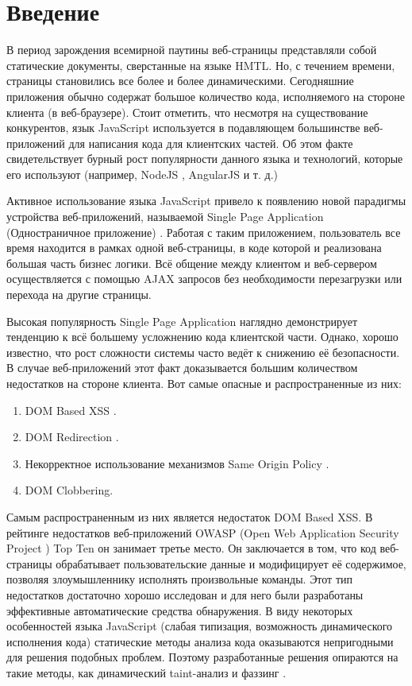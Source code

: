 
\chapter{Введение}\label{Introduction}

В период зарождения всемирной паутины веб-страницы представляли собой статические документы, сверстанные на языке HMTL. Но, с течением времени, страницы становились все более и более динамическими. Сегодняшние приложения обычно содержат большое количество кода, исполняемого на стороне клиента (в веб-браузере). Стоит отметить, что несмотря на существование конкурентов, язык JavaScript используется в подавляющем большинстве веб-приложений для написания кода для клиентских частей. Об этом факте свидетельствует бурный рост популярности данного языка и технологий, которые его используют (например, NodeJS \cite{nodejs}, AngularJS \cite{angularjs} и т. д.)


Активное использование языка JavaScript привело к появлению новой парадигмы устройства веб-приложений, называемой Single Page Application (Одностраничное приложение) \cite{spa}. Работая с таким приложением, пользователь все время находится в рамках одной веб-страницы, в коде которой и реализована большая часть бизнес логики. Всё общение между клиентом и веб-сервером осуществляется с помощью AJAX \cite{ajax} запросов без необходимости перезагрузки или перехода на другие страницы.


Высокая популярность Single Page Application наглядно демонстрирует тенденцию к всё большему усложнению кода клиентской части. Однако, хорошо известно, что рост сложности системы часто ведёт к снижению её безопасности. В случае веб-приложений этот факт доказывается большим количеством недостатков на стороне клиента. Вот самые опасные и распространенные из них:

\begin{enumerate}
	\item DOM Based XSS \cite{domxss}.
	\item DOM Redirection \cite{domredirect}.
	\item Некорректное использование механизмов Same Origin Policy \cite{sop}.
	\item DOM Clobbering.
\end{enumerate}


Самым распространенным из них является недостаток DOM Based XSS. В рейтинге недостатков веб-приложений OWASP (Open Web Application Security Project \cite{owasp}) Top Ten \cite{topten} он занимает третье место. Он заключается в том, что код веб-страницы обрабатывает пользовательские данные и модифицирует её содержимое, позволяя злоумышленнику исполнять произвольные команды. Этот тип недостатков достаточно хорошо исследован и для него были разработаны эффективные автоматические средства обнаружения. В виду некоторых особенностей языка JavaScript \cite{Richards2010} (слабая типизация, возможность динамического исполнения кода) статические методы анализа кода оказываются непригодными для решения подобных проблем. Поэтому разработанные решения опираются на такие методы, как динамический taint-анализ и фаззинг \cite{miller}.


